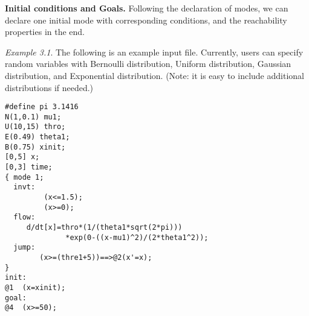\begin{comment}
each differential equation is of the format: "$d/dt \; [<var>]\;\;=\;\;<fun>;$". 

$
\{\;\; mode \;\; <int>;\\
invt: \;\; <mode\_invariant\; block>\\
flow: \;\; <ODE\; block>\\
jump: \;\; <jump\;block>\\
\}
$\\
\end{comment}


{\bf Initial conditions and Goals.} Following the declaration of modes, we can declare one initial mode with corresponding conditions, and the reachability properties in the end.\\
\begin{comment}
 via the following structure.\\

$
@Mode\_num\;\;\; [initial\_conditions]
$\\

{\bf Goals.} We can add the reachability properties in the end. Each property can be encoded in the following format.\\

$
@Mode\_num \;\;\; [reachability\_property]
$\\

\end{comment}

\noindent\textit{Example 3.1}. The following is an example input file. Currently, users can specify random variables with Bernoulli distribution, Uniform distribution, Gaussian distribution, and Exponential distribution. (Note: it is easy to include additional distributions if needed.)
\lstset{basicstyle=\ttfamily\small, numbers=left, breaklines=true }
\begin{lstlisting}
#define pi 3.1416
N(1,0.1) mu1;
U(10,15) thro;
E(0.49) theta1;
B(0.75) xinit;
[0,5] x;
[0,3] time;
{ mode 1; 
  invt:
         (x<=1.5);
         (x>=0);
  flow:
	 d/dt[x]=thro*(1/(theta1*sqrt(2*pi)))
	          *exp(0-((x-mu1)^2)/(2*theta1^2));
  jump:
        (x>=(thre1+5))==>@2(x'=x);
}
init:
@1	(x=xinit);
goal:
@4	(x>=50);
\end{lstlisting}


